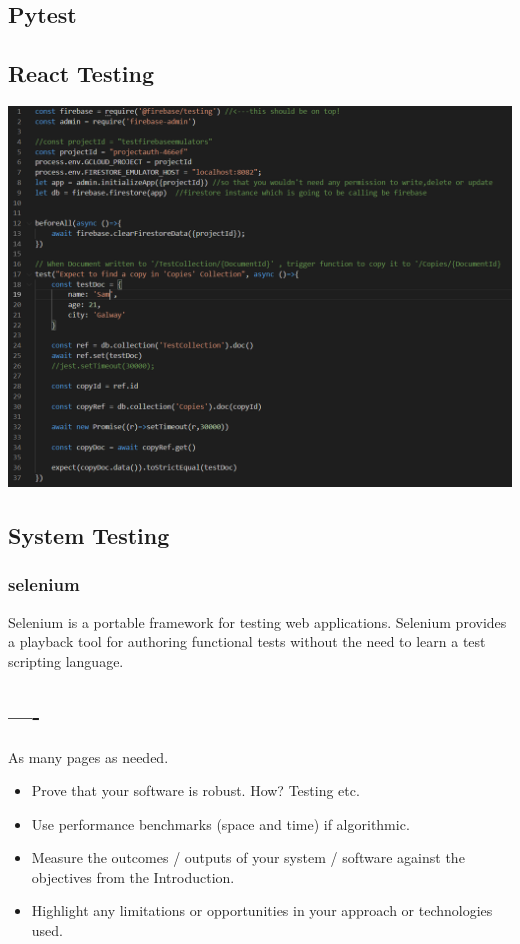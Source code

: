 \subsection{Pytest}
\subsection{React Testing}
\begin{center}    
      \includegraphics[scale=0.6]{img/jest.PNG}
\end{center}

\subsection{System Testing}
\subsubsection{selenium}
Selenium is a portable framework for testing web applications. Selenium provides a playback tool for authoring functional tests without the need to learn a test scripting language.



















\subsection{----}
As many pages as needed.
\begin{itemize}
\item Prove that your software is robust. How? Testing etc. 
\item Use performance benchmarks (space and time) if algorithmic.
\item Measure the outcomes / outputs of your system / software against the objectives from the Introduction.
\item Highlight any limitations or opportunities in your approach or technologies used.
\end{itemize}

